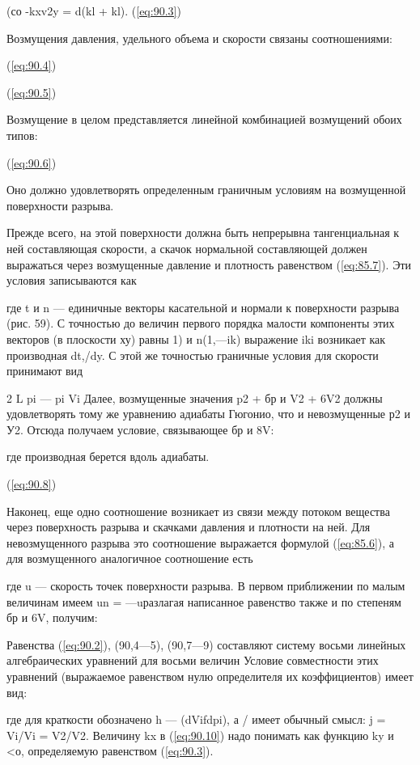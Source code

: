 (со -kxv2y = d(kl + kl).	(\ref{eq:90.3})

Возмущения давления, удельного объема и скорости связаны соотношениями:

(\ref{eq:90.4})

(\ref{eq:90.5})

Возмущение в целом представляется линейной комбинацией возмущений обоих типов:

(\ref{eq:90.6})

Оно должно удовлетворять определенным граничным условиям на возмущенной
поверхности разрыва.

Прежде всего, на этой поверхности должна быть непрерывна тангенциальная к ней
составляющая скорости, а скачок нормальной составляющей должен выражаться через
возмущенные давление и плотность равенством (\ref{eq:85.7}). Эти условия
записываются как


где t и n — единичные векторы касательной и нормали к поверхности разрыва (рис.
59). С точностью до величин первого порядка малости компоненты этих векторов (в
плоскости ху) равны	1) и n(1,—ik) выражение iki возникает как производная
dt,/dy. С этой же точностью граничные условия для скорости принимают вид



2 L pi — pi Vi Далее, возмущенные значения p2 + бр и V2 + 6V2 должны
удовлетворять тому же уравнению адиабаты Гюгонио, что и невозмущенные р2 и У2.
Отсюда получаем условие, связывающее бр и 8V:

где производная берется вдоль адиабаты.

(\ref{eq:90.8})


Наконец, еще одно соотношение возникает из связи между потоком вещества через
поверхность разрыва и скачками давления и плотности на ней. Для невозмущенного
разрыва это соотношение выражается формулой (\ref{eq:85.6}), а для возмущенного
аналогичное соотношение есть


где u — скорость точек поверхности разрыва. В первом приближении по малым
величинам имеем un = —uразлагая написанное равенство также и по степеням бр и
6V, получим:


Равенства (\ref{eq:90.2}), (90,4—5), (90,7—9) составляют систему восьми
линейных алгебраических уравнений для восьми величин Условие совместности этих
уравнений (выражаемое равенством нулю определителя их коэффициентов) имеет вид:


где для краткости обозначено h — (dVifdpi), а / имеет обычный смысл: j = Vi/Vi
= V2/V2. Величину kx в (\ref{eq:90.10}) надо понимать как функцию ky и <о,
определяемую равенством (\ref{eq:90.3}).

